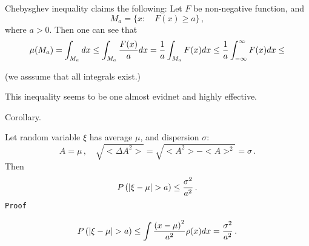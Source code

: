 

\baselineskip=14pt
\def\vare {\varepsilon}
\def\t {\tilde}
\def\a {\alpha}
\def\K {{\bf K}}
\def\N {{\bf N}}
\def\C {{\cal C}}
\def\L {{\cal L}}
\def\E {{\cal E}}
\def\s {{\sigma}}
\def\S {{\Sigma}}
\def\p{\partial}
\def\vare{{\varepsilon}}
\def\Q {{\bf Q}}
\def\D {{\cal D}}
\def\G {{\Gamma}}
\def\Z {{\bf Z}}
\def\R  {{\bf R}}
\def\l {\lambda}
\def\ll {{\bf l}}
\def\degree {{\bf {\rm degree}\,\,}}
\def \finish {${\,\,\vrule height1mm depth2mm width 8pt}$}
\def \m {\medskip}
\def\p {\partial}
\def\r {{\bf r}}
\def\pt {{\bf p}}
\def\v {{\bf v}}
\def\n {{\bf n}}
\def\t {{\bf t}}
\def\b {{\bf b}}
\def\c {{\bf c }}
\def\e{{\bf e}}
\def\ac {{\bf a}}
\def \X   {{\bf X}}
\def \Y   {{\bf Y}}
\def \x   {{\bf x}}
\def \y   {{\bf y}}
\def\w {{\omega}}
\def \Tr  {{\rm Tr\,}}
\def\dim {{\rm dim\,\,}}
\def\t {{\tilde}} 


Chebysghev inequality claims the following:
   Let   $F$  be non-negative function, and
      $$
M_a=\{x\colon\quad F(x)\geq a\}\,,
      $$
where $a>0$. Then one can see that
       $$
\mu(M_a)=\int_{M_a} dx\leq 
\int_{M_a} {F(x)\over a}dx= 
{1\over a}\int_{M_a} F(x)dx\leq
{1\over a}\int^\infty _{-\infty} F(x)dx\leq
       $$

(we asssume that all integrals exist.)


This inequality seems to be one almost evidnet and highly effective.

  Corollary.

   Let  random variable $\xi$ has average $\mu$, 
and dispersion $\sigma$:  
              $$
{A}=\mu\,,\quad
\sqrt{<\Delta A^2>}=
\sqrt{<A^2>-<A>^2}=\sigma\,.
        $$
Then
      $$
P\left(|\xi-\mu|>a\right)\leq {\sigma^2\over a^2}\,.
      $$
{\tt Proof}

      $$
P\left(|\xi-\mu|>a\right)\leq \int 
{\left(x-\mu\right)^2\over a^2}\rho(x)dx={\sigma^2\over a^2} \,.
      $$

\bye
